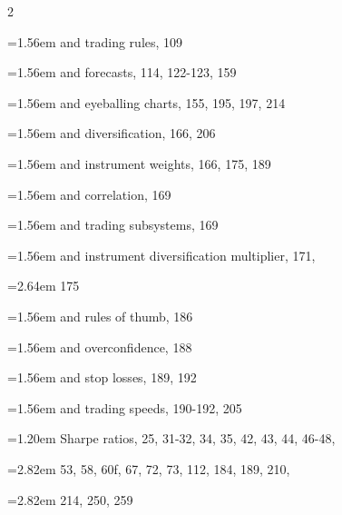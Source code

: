 {\begin{multicols}{2}
\par \noindent\hangindent=1.56em\hspace*{0.36em} and trading rules, 109
\par \noindent\hangindent=1.56em\hspace*{0.36em} and forecasts, 114, 122-123, 159
\par \noindent\hangindent=1.56em\hspace*{0.36em} and eyeballing charts, 155, 195, 197, 214
\par \noindent\hangindent=1.56em\hspace*{0.36em} and diversification, 166, 206
\par \noindent\hangindent=1.56em\hspace*{0.36em} and instrument weights, 166, 175, 189
\par \noindent\hangindent=1.56em\hspace*{0.36em} and correlation, 169
\par \noindent\hangindent=1.56em\hspace*{0.36em} and trading subsystems, 169
\par \noindent\hangindent=1.56em\hspace*{0.36em} and instrument diversification multiplier, 171,
\par \noindent\hangindent=2.64em\hspace*{1.44em} 175
\par \noindent\hangindent=1.56em\hspace*{0.36em} and rules of thumb, 186
\par \noindent\hangindent=1.56em\hspace*{0.36em} and overconfidence, 188
\par \noindent\hangindent=1.56em\hspace*{0.36em} and stop losses, 189, 192
\par \noindent\hangindent=1.56em\hspace*{0.36em} and trading speeds, 190-192, 205
\par \noindent\hangindent=1.20em\hspace*{0.00em} Sharpe ratios, 25, 31-32, 34, 35, 42, 43, 44, 46-48,
\par \noindent\hangindent=2.82em\hspace*{1.62em} 53, 58, 60f, 67, 72, 73, 112, 184, 189, 210,
\par \noindent\hangindent=2.82em\hspace*{1.62em} 214, 250, 259

\end{multicols}}
